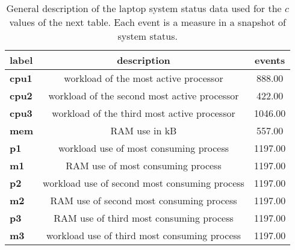 \begin{table}[h!]
\begin{center}
\begin{tabular}{| l || c | c |}\hline
label & description & events \\\hline\hline
{\bf cpu1} & workload of the most active processor & 888.00 \\\hline
{\bf cpu2} & workload of the second most active processor & 422.00 \\\hline
{\bf cpu3} & workload of the third most active processor & 1046.00 \\\hline
{\bf mem} & RAM use in kB & 557.00 \\\hline
{\bf p1} & workload use of most consuming process & 1197.00 \\\hline
{\bf m1} & RAM use of most consuming process & 1197.00 \\\hline
{\bf p2} & workload use of second most consuming process & 1197.00 \\\hline
{\bf m2} & RAM use of second most consuming process & 1197.00 \\\hline
{\bf p3} & RAM use of third most consuming process & 1197.00 \\\hline
{\bf m3} & workload use of third most consuming process & 1197.00 \\\hline
\end{tabular}
\caption{General description of the laptop system status data used for the $c$ values of the next table. Each event is a measure in a snapshot of system status.}
\end{center}
\end{table}
